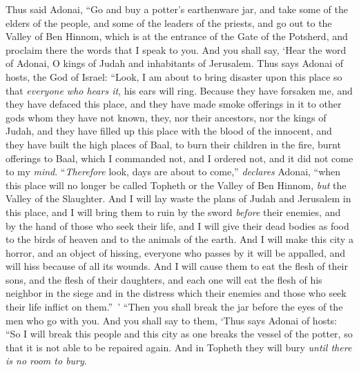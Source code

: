 \begin{biblechapter} %
 Thus said Adonai, “Go and buy a potter’s earthenware jar, and take some of the elders of the people, and some of the leaders of the priests,
\verse and go out to the Valley of Ben Hinnom, which is at the entrance of the Gate of the Potsherd, and proclaim there the words that I speak to you.
\verse And you shall say, ‘Hear the word of Adonai, O kings of Judah and inhabitants of Jerusalem. Thus says Adonai of hosts, the God of Israel: “Look, I am about to bring disaster upon this place so that \textit{everyone who hears it}, his ears will ring.
\verse Because they have forsaken me, and they have defaced this place, and they have made smoke offerings in it to other gods whom they have not known, they, nor their ancestors, nor the kings of Judah, and they have filled up this place with the blood of the innocent,
\verse and they have built the high places of Baal, to burn their children in the fire, burnt offerings to Baal, which I commanded not, and I ordered not, and it did not come to my \textit{mind}.
\verse “\textit{Therefore} look, days are about to come,” \textit{declares} Adonai, “when this place will no longer be called Topheth or the Valley of Ben Hinnom, \textit{but} the Valley of the Slaughter.
\verse And I will lay waste the plans of Judah and Jerusalem in this place, and I will bring them to ruin by the sword \textit{before} their enemies, and by the hand of those who seek their life, and I will give their dead bodies as food to the birds of heaven and to the animals of the earth.
\verse And I will make this city a horror, and an object of hissing, everyone who passes by it will be appalled, and will hiss because of all its wounds.
\verse And I will cause them to eat the flesh of their sons, and the flesh of their daughters, and each one will eat the flesh of his neighbor in the siege and in the distress which their enemies and those who seek their life inflict on them.” ’
\verse “Then you shall break the jar before the eyes of the men who go with you.
\verse And you shall say to them, ‘Thus says Adonai of hosts: “So I will break this people and this city as one breaks the vessel of the potter, so that it is not able to be repaired again. And in Topheth they will bury \textit{until there is no room to bury}.

\end{biblechapter}
